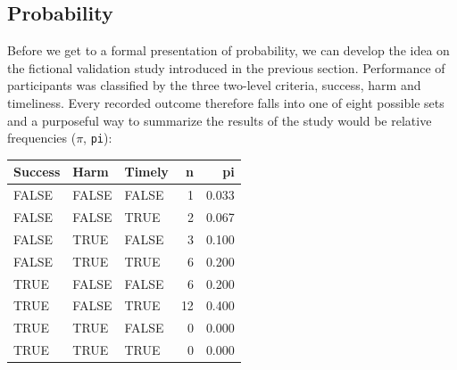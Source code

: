 \documentclass[]{svmono}
\newenvironment{Shaded}{\begin{snugshade}}{\end{snugshade}}
\newcommand{\KeywordTok}[1]{\textcolor[rgb]{0.13,0.29,0.53}{\textbf{#1}}}
\newcommand{\DataTypeTok}[1]{\textcolor[rgb]{0.13,0.29,0.53}{#1}}
\newcommand{\DecValTok}[1]{\textcolor[rgb]{0.00,0.00,0.81}{#1}}
\newcommand{\StringTok}[1]{\textcolor[rgb]{0.31,0.60,0.02}{#1}}
\newcommand{\CommentTok}[1]{\textcolor[rgb]{0.56,0.35,0.01}{\textit{#1}}}
\newcommand{\OperatorTok}[1]{\textcolor[rgb]{0.81,0.36,0.00}{\textbf{#1}}}
\newcommand{\NormalTok}[1]{#1}
\theoremstyle{definition}
\theoremstyle{definition}
\theoremstyle{definition}
\theoremstyle{remark}
\begin{document}
\subsection{Probability}\label{probability}

Before we get to a formal presentation of probability, we can develop
the idea on the fictional validation study introduced in the previous
section. Performance of participants was classified by the three
two-level criteria, success, harm and timeliness. Every recorded outcome
therefore falls into one of eight possible sets and a purposeful way to
summarize the results of the study would be relative frequencies
(\(\pi\), \texttt{pi}):

\begin{Shaded}
\end{Shaded}

\begin{tabular}{l|l|l|r|r}
\hline
Success & Harm & Timely & n & pi\\
\hline
FALSE & FALSE & FALSE & 1 & 0.033\\
\hline
FALSE & FALSE & TRUE & 2 & 0.067\\
\hline
FALSE & TRUE & FALSE & 3 & 0.100\\
\hline
FALSE & TRUE & TRUE & 6 & 0.200\\
\hline
TRUE & FALSE & FALSE & 6 & 0.200\\
\hline
TRUE & FALSE & TRUE & 12 & 0.400\\
\hline
TRUE & TRUE & FALSE & 0 & 0.000\\
\hline
TRUE & TRUE & TRUE & 0 & 0.000\\
\hline
\end{tabular}
\end{document}
